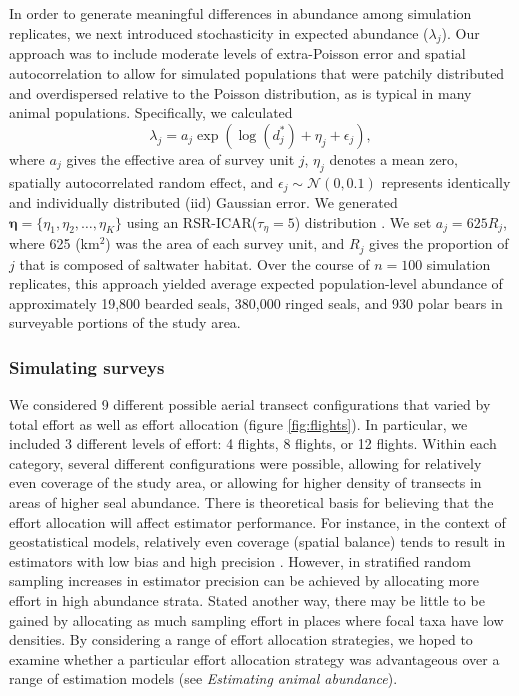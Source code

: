 \documentclass[]{rsos}%
\begin{document}
{In order to generate meaningful differences in abundance among simulation replicates, we next introduced stochasticity in expected abundance ($\lambda_j$).  Our approach was to include moderate levels of extra-Poisson error and spatial autocorrelation to allow for simulated populations that were patchily distributed and overdispersed relative to the Poisson distribution, as is typical in many animal populations. Specifically, we calculated
\begin{equation*}
   \lambda_j = a_j \exp \left( \log(d_j^*)+\eta_j+\epsilon_j \right),
\end{equation*}
where $a_j$ gives the effective area of survey unit $j$, $\eta_j$ denotes a mean zero, spatially autocorrelated random effect, and $\epsilon_j \sim \mathcal{N}(0,0.1)$ represents identically and individually distributed (iid) Gaussian error.  We generated $\boldsymbol{\eta} = \{ \eta_1, \eta_2, \hdots, \eta_K \}$ using an RSR-ICAR($\tau_\eta = 5$) distribution \cite{ConnEtAl2014}. We set $a_j = 625R_j$, where 625 (km$^2$) was the area of each survey unit, and $R_j$ gives the proportion of $j$ that is composed of saltwater habitat.  Over the course of $n=100$ simulation replicates, this approach yielded average expected population-level abundance of approximately 19,800 bearded seals, 380,000 ringed seals, and 930 polar bears in surveyable portions of the study area.

\subsubsection{Simulating surveys}

We considered 9 different possible aerial transect configurations that varied by total effort as well as effort allocation (figure \ref{fig:flights}). In particular, we included 3 different levels of effort: 4 flights, 8 flights, or 12 flights.  Within each category, several different configurations were possible, allowing for relatively even coverage of the study area, or allowing for higher density of transects in areas of higher seal abundance.  There is theoretical basis for believing that the effort allocation will affect estimator performance.  For instance, in the context of geostatistical models, relatively even coverage (spatial balance) tends to result in estimators with low bias and high precision \cite{RoyleNychka1998,StevensOlsen2004}.  However, in stratified random sampling \cite{Cochran1977} increases in estimator precision can be achieved by allocating more effort in high abundance strata.  Stated another way, there may be little to be gained by allocating as much sampling effort in places where focal taxa have low densities.  By considering a range of effort allocation strategies, we hoped to examine whether a particular effort allocation strategy was advantageous over a range of estimation models (see \textit{Estimating animal abundance}).

}
\end{document}
